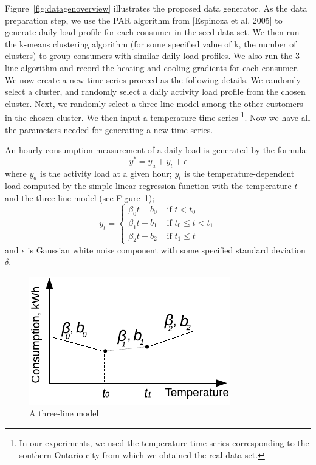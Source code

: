 \documentclass[a4paper,12pt]{llncs}
\begin{document}
Figure~\ref{fig:datagenoverview} illustrates the proposed data generator. As the data preparation step, we use the PAR algorithm from [Espinoza et al. 2005] to generate daily load profile for each consumer in the seed data set. We then run the k-means clustering algorithm (for some specified value of k, the number of clusters) to group consumers with similar daily load profiles. We also run the 3-line algorithm and record the heating and cooling gradients for each consumer. We now create a new time series proceed as the following details. We randomly select a cluster, and randomly select a daily activity load profile from the chosen cluster. Next, we randomly select a three-line model among the other customers in the chosen cluster. We then input a temperature time series \footnote{In our experiments, we used the temperature time series corresponding to the southern-Ontario city from which we obtained the real data set.}. Now we have all the parameters needed for generating a new time series. 

An hourly consumption measurement of a daily load is generated by the formula:
\begin{equation}
y^* = y_{a}   + y_t  + \epsilon
\end{equation}
where $ y_{a}$ is the activity load at a given hour; $y_t$ is the temperature-dependent load computed by the simple linear regression function with the temperature $t$ and the three-line model (see Figure~\ref{fig:genthreeline});
\begin{equation}
y_t = 
\begin{cases}
 \beta_0t + b_0 & \text{ if } t < t_0  \\ 
\beta_1t + b_1 & \text{ if } t_0 \leq t < t_1 \\ 
\beta_2t + b_2 & \text{ if } t_1 \leq t 
\end{cases}
\end{equation}
and $\epsilon$ is Gaussian white noise component with some specified standard deviation $\delta$. 

\begin{figure}[t]
\centering
\includegraphics[scale=0.8]{images/genthreeline}
\caption{A three-line model}
\label{fig:genthreeline} 
\end{figure}
\end{document}
